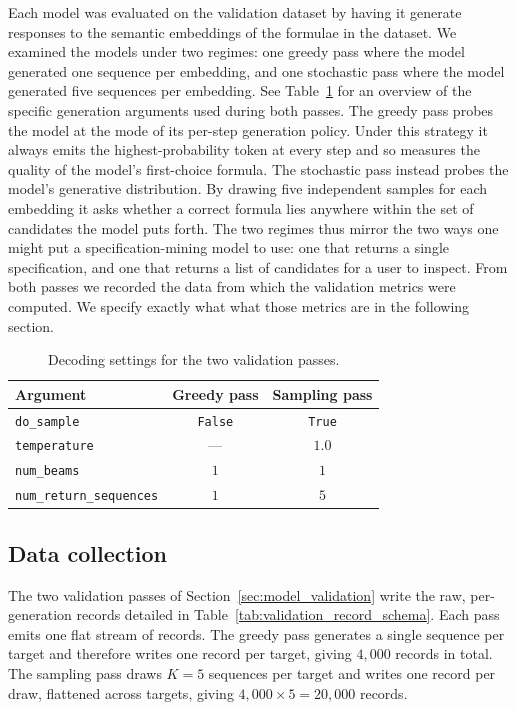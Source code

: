 \documentclass[titlepage,a4paper,11pt]{report}
\begin{document}
    Each model was evaluated on the validation dataset by having it generate responses to the semantic embeddings of the formulae in the dataset. We examined the models under two regimes: one greedy pass where the model generated one sequence per embedding, and one stochastic pass where the model generated five sequences per embedding. See Table~\ref{tab:validation_generation_settings} for an overview of the specific generation arguments used during both passes. The greedy pass probes the model at the mode of its per-step generation policy. Under this strategy it always emits the highest-probability token at every step and so measures the quality of the model's first-choice formula. The stochastic pass instead probes the model's generative distribution. By drawing five independent samples for each embedding it asks whether a correct formula lies anywhere within the set of candidates the model puts forth. The two regimes thus mirror the two ways one might put a specification-mining model to use: one that returns a single specification, and one that returns a list of candidates for a user to inspect. From both passes we recorded the data from which the validation metrics were computed. We specify exactly what what those metrics are in the following section. 
    
    \begin{table}[h]
        \centering
        \caption{Decoding settings for the two validation passes.}
        \label{tab:validation_generation_settings}
        \begin{tabular}{lcc}
            \toprule
            Argument & Greedy pass & Sampling pass \\
            \midrule
            \texttt{do\_sample}             & \texttt{False}    & \texttt{True} \\
            \texttt{temperature}            & ---               & $1.0$ \\
            \texttt{num\_beams}             & $1$               & $1$ \\
            \texttt{num\_return\_sequences} & $1$               & $5$ \\
            \bottomrule
        \end{tabular}
    \end{table}
    
    \subsection{Data collection}\label{sec:data_collection}
    The two validation passes of Section~\ref{sec:model_validation} write the raw, per-generation records detailed in Table~\ref{tab:validation_record_schema}. Each pass emits one flat stream of records. The greedy pass generates a single sequence per target and therefore writes one record per target, giving $4{,}000$ records in total. The sampling pass draws $K = 5$ sequences per target and writes one record per draw, flattened across targets, giving $4{,}000 \times 5 = 20{,}000$ records.
\end{document}
